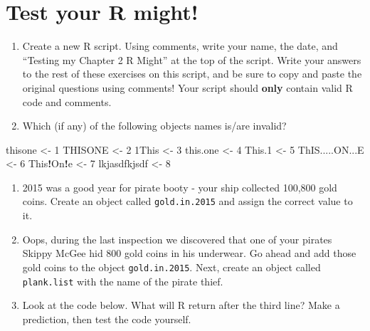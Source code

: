 \documentclass[]{book}
\newenvironment{Shaded}{\begin{snugshade}}{\end{snugshade}}
\newcommand{\DecValTok}[1]{\textcolor[rgb]{0.00,0.00,0.81}{#1}}
\newcommand{\StringTok}[1]{\textcolor[rgb]{0.31,0.60,0.02}{#1}}
\newcommand{\OperatorTok}[1]{\textcolor[rgb]{0.81,0.36,0.00}{\textbf{#1}}}
\newcommand{\NormalTok}[1]{#1}
\theoremstyle{definition}
\theoremstyle{definition}
\theoremstyle{remark}
\begin{document}
\section{Test your R might!}\label{test-your-r-might}

\begin{enumerate}
\def\labelenumi{\arabic{enumi}.}
\item
  Create a new R script. Using comments, write your name, the date, and
  ``Testing my Chapter 2 R Might'' at the top of the script. Write your
  answers to the rest of these exercises on this script, and be sure to
  copy and paste the original questions using comments! Your script
  should \textbf{only} contain valid R code and comments.
\item
  Which (if any) of the following objects names is/are invalid?
\end{enumerate}

\begin{Shaded}
\begin{Highlighting}[]
\NormalTok{thisone <-}\StringTok{ }\DecValTok{1}
\NormalTok{THISONE <-}\StringTok{ }\DecValTok{2}
\NormalTok{1This <-}\StringTok{ }\DecValTok{3}
\NormalTok{this.one <-}\StringTok{ }\DecValTok{4}
\NormalTok{This.}\DecValTok{1}\NormalTok{ <-}\StringTok{ }\DecValTok{5}
\NormalTok{ThIS.....ON...E <-}\StringTok{ }\DecValTok{6}
\NormalTok{This}\OperatorTok{!}\NormalTok{On}\OperatorTok{!}\NormalTok{e <-}\StringTok{ }\DecValTok{7}
\NormalTok{lkjasdfkjsdf <-}\StringTok{ }\DecValTok{8}
\end{Highlighting}
\end{Shaded}

\begin{enumerate}
\def\labelenumi{\arabic{enumi}.}
\setcounter{enumi}{2}
\item
  2015 was a good year for pirate booty - your ship collected 100,800
  gold coins. Create an object called \texttt{gold.in.2015} and assign
  the correct value to it.
\item
  Oops, during the last inspection we discovered that one of your
  pirates Skippy McGee hid 800 gold coins in his underwear. Go ahead and
  add those gold coins to the object \texttt{gold.in.2015}. Next, create
  an object called \texttt{plank.list} with the name of the pirate
  thief.
\item
  Look at the code below. What will R return after the third line? Make
  a prediction, then test the code yourself.
\end{enumerate}
\end{document}
